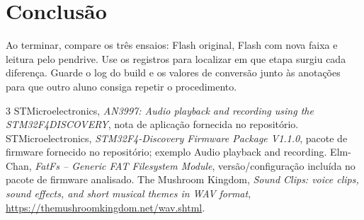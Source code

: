 \documentclass[12pt,journal,compsoc]{IEEEtran}
\begin{document}
\section{Conclusão}
Ao terminar, compare os três ensaios: Flash original, Flash com nova faixa e leitura pelo pendrive. Use os registros para localizar em que etapa surgiu cada diferença. Guarde o log do build e os valores de conversão junto às anotações para que outro aluno consiga repetir o procedimento.

\begin{thebibliography}{3}
 STMicroelectronics, \textit{AN3997: Audio playback and recording using the STM32F4DISCOVERY}, nota de aplicação fornecida no repositório.
 STMicroelectronics, \textit{STM32F4-Discovery Firmware Package V1.1.0}, pacote de firmware fornecido no repositório; exemplo Audio playback and recording.
 Elm-Chan, \textit{FatFs -- Generic FAT Filesystem Module}, versão/configuração incluída no pacote de firmware analisado.
 The Mushroom Kingdom, \textit{Sound Clips: voice clips, sound effects, and short musical themes in WAV format}, \url{https://themushroomkingdom.net/wav.shtml}.
\end{thebibliography}
\end{document}
